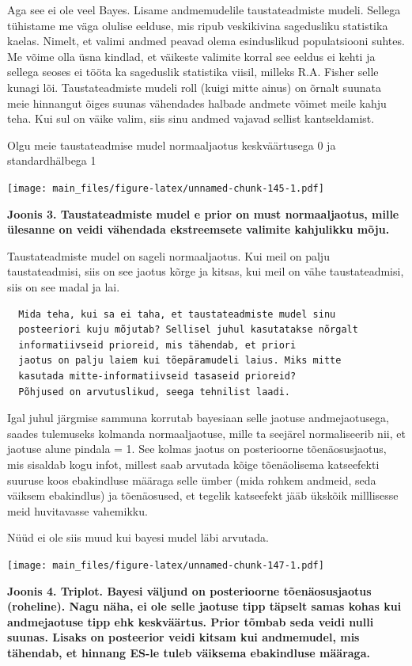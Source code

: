 \documentclass[]{book}
\begin{document}
Aga see ei ole veel Bayes. Lisame andmemudelile taustateadmiste mudeli.
Sellega tühistame me väga olulise eelduse, mis ripub veskikivina
sagedusliku statistika kaelas. Nimelt, et valimi andmed peavad olema
esinduslikud populatsiooni suhtes. Me võime olla üsna kindlad, et
väikeste valimite korral see eeldus ei kehti ja sellega seoses ei tööta
ka sageduslik statistika viisil, milleks R.A. Fisher selle kunagi lõi.
Taustateadmiste mudeli roll (kuigi mitte ainus) on õrnalt suunata meie
hinnangut õiges suunas vähendades halbade andmete võimet meile kahju
teha. Kui sul on väike valim, siis sinu andmed vajavad sellist
kantseldamist.

Olgu meie taustateadmise mudel normaaljaotus keskväärtusega 0 ja
standardhälbega 1

\texttt{[image: main\_files/figure-latex/unnamed-chunk-145-1.pdf]}

\textbf{Joonis 3. Taustateadmiste mudel e prior on must normaaljaotus,
mille ülesanne on veidi vähendada ekstreemsete valimite kahjulikku
mõju.}

Taustateadmiste mudel on sageli normaaljaotus. Kui meil on palju
taustateadmisi, siis on see jaotus kõrge ja kitsas, kui meil on vähe
taustateadmisi, siis on see madal ja lai.

\begin{verbatim}
  Mida teha, kui sa ei taha, et taustateadmiste mudel sinu 
  posteeriori kuju mõjutab? Sellisel juhul kasutatakse nõrgalt 
  informatiivseid prioreid, mis tähendab, et priori 
  jaotus on palju laiem kui tõepäramudeli laius. Miks mitte 
  kasutada mitte-informatiivseid tasaseid prioreid? 
  Põhjused on arvutuslikud, seega tehnilist laadi.
\end{verbatim}

Igal juhul järgmise sammuna korrutab bayesiaan selle jaotuse
andmejaotusega, saades tulemuseks kolmanda normaaljaotuse, mille ta
seejärel normaliseerib nii, et jaotuse alune pindala = 1. See kolmas
jaotus on posterioorne tõenäosusjaotus, mis sisaldab kogu infot, millest
saab arvutada kõige tõenäolisema katseefekti suuruse koos ebakindluse
määraga selle ümber (mida rohkem andmeid, seda väiksem ebakindlus) ja
tõenäosused, et tegelik katseefekt jääb ükskõik milllisesse meid
huvitavasse vahemikku.

Nüüd ei ole siis muud kui bayesi mudel läbi arvutada.

\texttt{[image: main\_files/figure-latex/unnamed-chunk-147-1.pdf]}

\textbf{Joonis 4. Triplot. Bayesi väljund on posterioorne
tõenäosusjaotus (roheline). Nagu näha, ei ole selle jaotuse tipp täpselt
samas kohas kui andmejaotuse tipp ehk keskväärtus. Prior tõmbab seda
veidi nulli suunas. Lisaks on posteerior veidi kitsam kui andmemudel,
mis tähendab, et hinnang ES-le tuleb väiksema ebakindluse määraga.}
\end{document}
